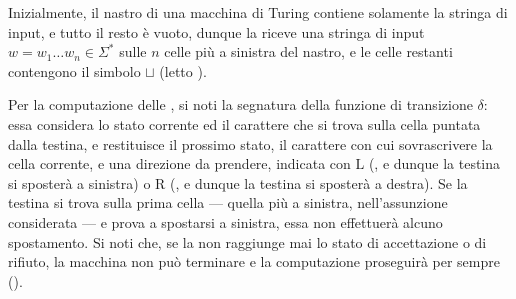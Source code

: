 \documentclass[a4paper, 12pt]{report}
\begin{document}
\begin{frameddefn}[label={tm},breakable]{\TM}
        Inizialmente, il nastro di una macchina di Turing contiene solamente la stringa di input, e tutto il resto è vuoto, dunque la \TM riceve una stringa di input $w = w_1 \ldots w_n \in \Sigma^*$ sulle $n$ celle più a sinistra del nastro, e le celle restanti contengono il simbolo $\sqcup$ (letto ).

        Per la computazione delle \TM, si noti la segnatura della funzione di transizione $\delta$: essa considera lo stato corrente ed il carattere che si trova sulla cella puntata dalla testina, e restituisce il prossimo stato, il carattere con cui sovrascrivere la cella corrente, e una direzione da prendere, indicata con $\mathrm L$ (, e dunque la testina si sposterà a sinistra) o $\mathrm R$ (, e dunque la testina si sposterà a destra). Se la testina si trova sulla prima cella --- quella più a sinistra, nell'assunzione considerata --- e prova a spostarsi a sinistra, essa non effettuerà alcuno spostamento. Si noti che, se la \TM non raggiunge mai lo stato di accettazione o di rifiuto, la macchina non può terminare e la computazione proseguirà per sempre ().
    \end{frameddefn}
\end{document}
